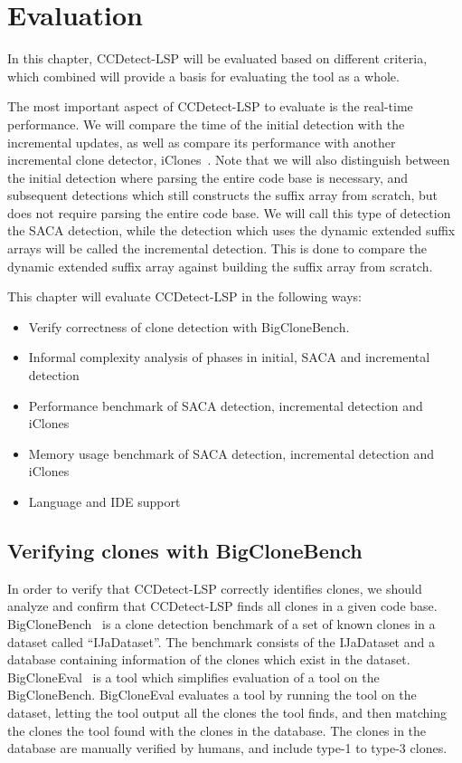 \chapter{Evaluation}
\label{evaluation}

In this chapter, CCDetect-LSP will be evaluated based on different criteria, which combined
will provide a basis for evaluating the tool as a whole.

The most important aspect of CCDetect-LSP to evaluate is the real-time performance. We
will compare the time of the initial detection with the incremental updates, as well as
compare its performance with another incremental clone detector,
iClones~\Cite{GodeIncrementalCloneDetection}. Note that we will also distinguish between
the initial detection where parsing the entire code base is necessary, and subsequent
detections which still constructs the suffix array from scratch, but does not require
parsing the entire code base. We will call this type of detection the SACA detection,
while the detection which uses the dynamic extended suffix arrays will be called the
incremental detection. This is done to compare the dynamic extended suffix array against
building the suffix array from scratch.

This chapter will evaluate CCDetect-LSP in the following ways:

\begin{itemize}
    \item Verify correctness of clone detection with BigCloneBench.
    \item Informal complexity analysis of phases in initial, SACA and incremental detection
    \item Performance benchmark of SACA detection, incremental detection and iClones
    \item Memory usage benchmark of SACA detection, incremental detection and iClones
    \item Language and IDE support
\end{itemize}



\section{Verifying clones with BigCloneBench}

In order to verify that CCDetect-LSP correctly identifies clones, we should analyze and
confirm that CCDetect-LSP finds all clones in a given code base.
BigCloneBench~\cite{BigCloneBench} is a clone detection benchmark of a set of known clones
in a dataset called ``IJaDataset''. The benchmark consists of the IJaDataset and a
database containing information of the clones which exist in the dataset.
BigCloneEval~\cite{BigCloneEval} is a tool which simplifies evaluation of a tool on the
BigCloneBench. BigCloneEval evaluates a tool by running the tool on the dataset, letting
the tool output all the clones the tool finds, and then matching the clones the tool found
with the clones in the database. The clones in the database are manually verified by
humans, and include type-1 to type-3 clones.

